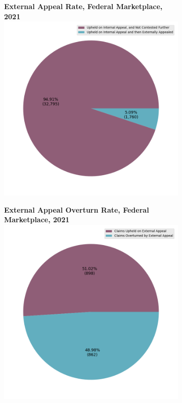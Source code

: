 \documentclass[12pt, a4paper,twoside]{report}
\theoremstyle{plain} %
\theoremstyle{definition} %
\theoremstyle{remark} %
\numberwithin{equation}{chapter}
\begin{document}
		\begin{figure}[h!]
			\centering
			\begin{subfigure}[b]{0.49\textwidth}
				\centering
				\textbf{External Appeal Rate, Federal Marketplace, 2021}
				\includegraphics[width=\textwidth]{images/cms_puf/external_appeal_rates_all_insurers.png}
			\end{subfigure}
			\hfill
			\begin{subfigure}[b]{0.49\textwidth}
				\centering
				\textbf{External Appeal Overturn Rate, Federal Marketplace, 2021}
				\includegraphics[width=\textwidth]{images/cms_puf/external_appeal_success_rates.png}

\end{subfigure}
\end{figure}
\end{document}
